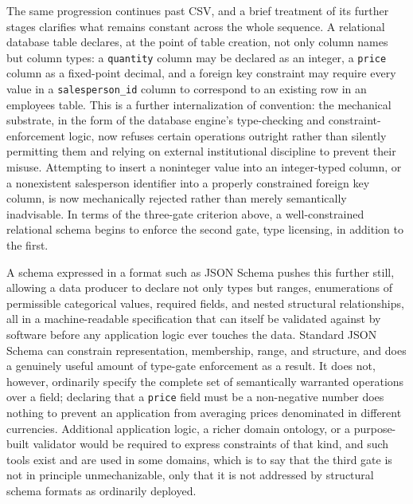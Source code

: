 \documentclass[11pt]{article}
\begin{document}
The same progression continues past CSV, and a brief treatment of its further stages clarifies what remains constant across the whole sequence. A relational database table declares, at the point of table creation, not only column names but column types: a \texttt{quantity} column may be declared as an integer, a \texttt{price} column as a fixed-point decimal, and a foreign key constraint may require every value in a \texttt{salesperson\_id} column to correspond to an existing row in an employees table. This is a further internalization of convention: the mechanical substrate, in the form of the database engine's type-checking and constraint-enforcement logic, now refuses certain operations outright rather than silently permitting them and relying on external institutional discipline to prevent their misuse. Attempting to insert a noninteger value into an integer-typed column, or a nonexistent salesperson identifier into a properly constrained foreign key column, is now mechanically rejected rather than merely semantically inadvisable. In terms of the three-gate criterion above, a well-constrained relational schema begins to enforce the second gate, type licensing, in addition to the first.

A schema expressed in a format such as JSON Schema pushes this further still, allowing a data producer to declare not only types but ranges, enumerations of permissible categorical values, required fields, and nested structural relationships, all in a machine-readable specification that can itself be validated against by software before any application logic ever touches the data. Standard JSON Schema can constrain representation, membership, range, and structure, and does a genuinely useful amount of type-gate enforcement as a result. It does not, however, ordinarily specify the complete set of semantically warranted operations over a field; declaring that a \texttt{price} field must be a non-negative number does nothing to prevent an application from averaging prices denominated in different currencies. Additional application logic, a richer domain ontology, or a purpose-built validator would be required to express constraints of that kind, and such tools exist and are used in some domains, which is to say that the third gate is not in principle unmechanizable, only that it is not addressed by structural schema formats as ordinarily deployed.
\end{document}
